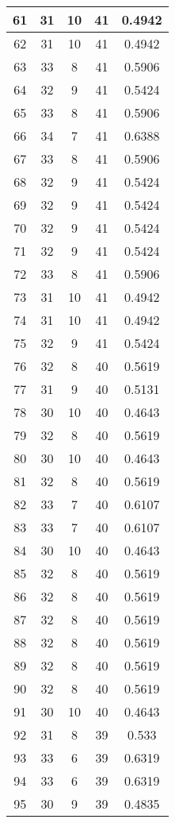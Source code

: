 \documentclass[letterpaper, 12pt]{article}
\begin{document}
\begin{longtable}{|c|c|c|c|c|}
61 & 31 & 10 & 41 & 0.4942 \\
\hline
62 & 31 & 10 & 41 & 0.4942 \\
\hline
63 & 33 & 8 & 41 & 0.5906 \\
\hline
64 & 32 & 9 & 41 & 0.5424 \\
\hline
65 & 33 & 8 & 41 & 0.5906 \\
\hline
66 & 34 & 7 & 41 & 0.6388 \\
\hline
67 & 33 & 8 & 41 & 0.5906 \\
\hline
68 & 32 & 9 & 41 & 0.5424 \\
\hline
69 & 32 & 9 & 41 & 0.5424 \\
\hline
70 & 32 & 9 & 41 & 0.5424 \\
\hline
71 & 32 & 9 & 41 & 0.5424 \\
\hline
72 & 33 & 8 & 41 & 0.5906 \\
\hline
73 & 31 & 10 & 41 & 0.4942 \\
\hline
74 & 31 & 10 & 41 & 0.4942 \\
\hline
75 & 32 & 9 & 41 & 0.5424 \\
\hline
76 & 32 & 8 & 40 & 0.5619 \\
\hline
77 & 31 & 9 & 40 & 0.5131 \\
\hline
78 & 30 & 10 & 40 & 0.4643 \\
\hline
79 & 32 & 8 & 40 & 0.5619 \\
\hline
80 & 30 & 10 & 40 & 0.4643 \\
\hline
81 & 32 & 8 & 40 & 0.5619 \\
\hline
82 & 33 & 7 & 40 & 0.6107 \\
\hline
83 & 33 & 7 & 40 & 0.6107 \\
\hline
84 & 30 & 10 & 40 & 0.4643 \\
\hline
85 & 32 & 8 & 40 & 0.5619 \\
\hline
86 & 32 & 8 & 40 & 0.5619 \\
\hline
87 & 32 & 8 & 40 & 0.5619 \\
\hline
88 & 32 & 8 & 40 & 0.5619 \\
\hline
89 & 32 & 8 & 40 & 0.5619 \\
\hline
90 & 32 & 8 & 40 & 0.5619 \\
\hline
91 & 30 & 10 & 40 & 0.4643 \\
\hline
92 & 31 & 8 & 39 & 0.533 \\
\hline
93 & 33 & 6 & 39 & 0.6319 \\
\hline
94 & 33 & 6 & 39 & 0.6319 \\
\hline
95 & 30 & 9 & 39 & 0.4835 \\

\end{longtable}
\end{document}
